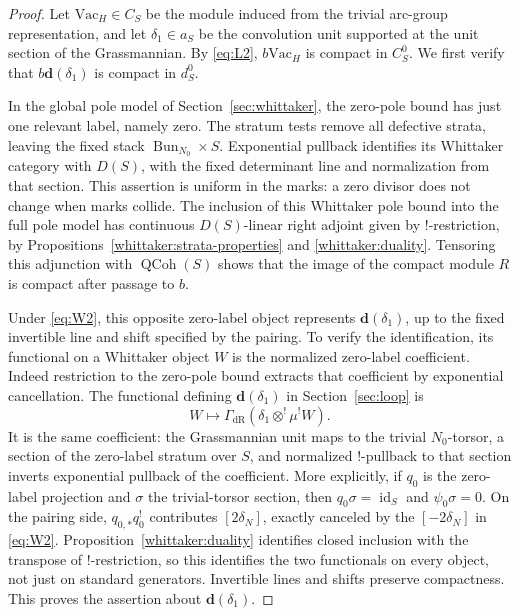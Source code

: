 \documentclass[11pt]{article}
\numberwithin{equation}{section}
\theoremstyle{definition}
\theoremstyle{remark}
\begin{document}
\begin{proof}
Let \(\mathrm{Vac}_H\in C_S\) be the module induced from the
trivial arc-group representation, and let \(\delta_1\in a_S\)
be the convolution unit supported at the unit section of the
Grassmannian.  By \eqref{eq:L2}, \(b\mathrm{Vac}_H\) is compact
in \(C_S^0\).  We first verify that
\(b\mathbf d(\delta_1)\) is compact in \(d_S^0\).

In the global pole model of Section~\ref{sec:whittaker}, the zero-pole
bound has just one relevant label, namely zero.  The stratum tests
remove all defective strata, leaving the fixed stack
\(\operatorname{Bun}_{N_0}\times S\).  Exponential pullback identifies
its Whittaker category with \(D(S)\), with the fixed determinant line
and normalization from that section.  This assertion is uniform in
the marks: a zero divisor does not change when marks collide.
The inclusion of this Whittaker pole bound into the full pole model
has continuous \(D(S)\)-linear right adjoint given by \(!\)-restriction,
by Propositions~\ref{whittaker:strata-properties} and
\ref{whittaker:duality}.  Tensoring this adjunction with
\(\operatorname{QCoh}(S)\) shows that the image of the compact
module \(R\) is compact after passage to \(b\).

Under \eqref{eq:W2}, this opposite zero-label object represents
\(\mathbf d(\delta_1)\), up to the fixed invertible line and shift
specified by the pairing.  To verify the identification, its
functional on a Whittaker object \(W\) is the normalized zero-label
coefficient.  Indeed restriction to the zero-pole bound extracts that
coefficient by exponential cancellation.  The functional defining
\(\mathbf d(\delta_1)\) in Section~\ref{sec:loop} is
\[
 W\longmapsto
 \Gamma_{\mathrm{dR}}(\delta_1\otimes^!\mu^!W).
\]
It is the same coefficient: the Grassmannian unit maps to the trivial
\(N_0\)-torsor, a section of the zero-label stratum over \(S\),
and normalized \(!\)-pullback to that section inverts exponential
pullback of the coefficient.  More explicitly, if \(q_0\) is the
zero-label projection and \(\sigma\) the trivial-torsor section,
then \(q_0\sigma=\operatorname{id}_S\) and
\(\psi_0\sigma=0\).  On the pairing side,
\(q_{0,*}q_0^!\) contributes \([2\delta_N]\), exactly canceled
by the \([-2\delta_N]\) in \eqref{eq:W2}.
Proposition~\ref{whittaker:duality}
identifies closed inclusion with the transpose of \(!\)-restriction,
so this identifies the two functionals on every object, not just
on standard generators.  Invertible lines and shifts preserve
compactness.  This proves the assertion about
\(\mathbf d(\delta_1)\).


\end{proof}
\end{document}
